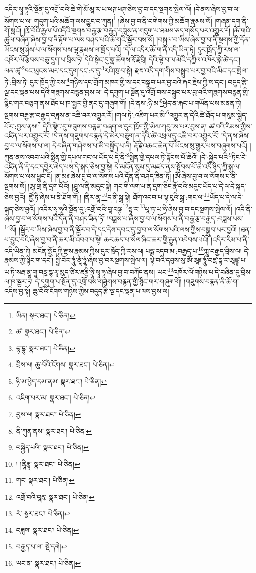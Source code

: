 འདིར་སྭཱ་ཧཱའི་སྔོན་དུ་འགྲོ་བའི་ཆེ་གེ་མོ་མཱ་ར་ཡ་ཕཊ་ཕཊ་ཅེས་བྱ་བ་དང་སྔགས་སྤེལ་ལོ། །དེ་ནས་ཞེས་བྱ་བ་ལ་སོགས་པ་ལ། གདུག་པའི་མཆོག་ལས་བྱུང་བ་ཀུན།\footnote{ཡིན།  སྣར་ཐང་།  པེ་ཅིན། } །ཞེས་བྱ་བ་ནི་བགེགས་ཀྱི་མཆོག་རྣམས་སོ། །གཞན་དག་ནི་གོ་སླའོ། །ཁྲོ་བོའི་རྒྱལ་པོ་འདིའི་སྔགས་བརྒྱ་རྩ་བརྒྱད་བཟླས་ན་གདུག་པ་ཐམས་ཅད་གསོད་པར་འགྱུར་རོ། །ཆོ་གའི་ཚུལ་བཞིན་ཞེས་བྱ་བ་ནི་རྟོག་པ་ལས་བཤད་པའི་ཆོ་གའི་སྦྱོར་བས་སོ། །བསྐུལ་བ་ཡིས་ཞེས་བྱ་བ་ནི་སྔགས་ཀྱི་དོན་ཡོངས་སུ་ཤེས་པ་ལ་སོགས་པས་ལྷ་རྣམས་ལ་སྦོད་པའོ། །དེ་ལ་འདིར་ཆོ་ག་ནི་འདི་ཡིན་ཏེ། དུར་ཁྲོད་ཀྱི་རས་ལ་འཁོར་ལོ་རྩིབས་བཅུ་དྲུག་པ་བྲིས་ཏེ། དེའི་སྟེང་དུ་སྣ་ཚོགས་རྡོ་རྗེ་བྲི། དེའི་ལྟེ་བ་ལ་མེའི་དཀྱིལ་འཁོར་སྐེ་ཚེ་དང་། ལན་ཚྭ་\footnote{ཚ་  སྣར་ཐང་།  པེ་ཅིན། }དང་ཡུངས་མར་དང་དུག་དང་:ད་དུ་\footnote{དྷ་དྷུ་  སྣར་ཐང་།  པེ་ཅིན། }རའི་ཁུ་བ་སྟེ། རྫས་འདི་དག་གིས་བསྒྲུབ་པར་བྱ་བའི་མིང་དང་སྤེལ་ཏེ་:བྲིས་ཏེ། དུར་ཁྲོད་ཀྱི་རས་\footnote{བྲིས་ལ། ཆུ་བོའི་ངོགས་  སྣར་ཐང་།  པེ་ཅིན། }གཉིས་དང་གྲོག་མཁར་གྱི་ས་དང་བསྒྲུབ་པར་བྱ་བའི་རྐང་རྗེས་ཀྱི་ས་དང་། བདུད་རྩི་ལྔ་དང་ལྡན་པས་དེའི་གཟུགས་བརྙན་བྱས་ལ། དེ་དགུག་པ་སྔོན་དུ་འགྲོ་བས་བསྒྲུབ་པར་བྱ་བའི་གཟུགས་བརྙན་གྱི་སྙིང་གར་བཅུག་ནས་ཐོད་པ་ཁ་སྦྱར་གྱི་ནང་དུ་གཞུག་གོ། །དེ་ནས་:ཉི་མ་\footnote{ཉི་མ་ཕྱེད་དམ་ནམ་  སྣར་ཐང་།  པེ་ཅིན། }ཕྱེད་ན་རྐང་པ་གཡོན་པས་མནན་ཏེ། སྔགས་བརྒྱ་རྩ་བརྒྱད་བཟླས་ན་འཆི་བར་འགྱུར་རོ། །གལ་ཏེ་:འཇིག་པར་མི་\footnote{འཇིག་པར་མ་  སྣར་ཐང་།  པེ་ཅིན། }འགྱུར་ན་དེའི་ཚེ་ཐོད་པ་གསུམ་སྒྱེད་པོར་:བྱས་ནས།\footnote{བྱས་ལ།  སྣར་ཐང་།  པེ་ཅིན། } དེའི་སྟེང་དུ་གཟུགས་བརྙན་བཞག་ལ་དུར་ཁྲོད་ཀྱི་མེས་གདུངས་པར་བྱས་ན། ཚ་བའི་རིམས་ཀྱིས་འཛིན་པར་འགྱུར་རོ། །དེ་ནས་གཟུགས་བརྙན་དེ་མེར་བཅུག་ན་དེའི་ཚེ་འཕྲལ་དུ་འཆི་བར་འགྱུར་རོ། །དེ་ནས་ཞེས་བྱ་བ་ལ་སོགས་པ་ལ། དེ་བཞིན་གཤེགས་པ་མི་བསྐྱོད་པ་ནི། རྡོ་རྗེ་འཆང་ཆེན་པོ་ཡོངས་སུ་གྱུར་པས་བཞུགས་པའོ། །ཀུན་ནས་འབབ་པའི་སྤྲིན་གྱི་དཔལ་གང་ལ་ཡོད་པ་དེ་ནི་\footnote{ནི་ཀུན་ནས་  སྣར་ཐང་།  པེ་ཅིན། }སྤྲིན་གྱི་དཔལ་ཏེ་སྟོབས་པོ་ཆེའོ། །དེ་:སྐྱེད་པའི་\footnote{བསྐྱེད་པའི་  སྣར་ཐང་།  པེ་ཅིན། }ཏིང་ངེ་འཛིན་ནི་དེ་དང་དབྱེར་མེད་པས་དེ་སྐད་ཅེས་བྱ་སྟེ། དེ་མངོན་སུམ་དུ་མཛད་ནས་སྟོབས་པོ་ཆེ་འདི་ཉིད་ཀྱི་སྐུ་ལ་སོགས་པ་ལས་ཕྱུང་ངོ། །ན་མཿ་ཞེས་བྱ་བ་ལ་སོགས་པའི་དོན་ནི་བཤད་ཟིན་ཏོ། །ཨོཾ་ཞེས་བྱ་བ་ལ་སོགས་པ་ནི་སྔགས་སོ། །ཨུ་གྲ་ནི་དྲག་པོའོ། །ཤཱུ་ལ་ནི་མདུང་སྟེ། གང་གི་ལག་པ་ན་དྲག་ཅིང་རྣོ་བའི་མདུང་ཡོད་པ་དེ་ལ་དེ་སྐད་ཅེས་བྱའོ། །ཛྱོ་ཏི་ཞེས་པ་ནི་ཐོག་གོ:། །ནིར་ནཱ་\footnote{། །ནཱིརྣཱ་  སྣར་ཐང་།  པེ་ཅིན། }ད་ནི་སྒྲ་སྟེ། ཐོག་འབབ་པ་ལྟ་བུའི་སྒྲ་:གང་ལ་\footnote{གང་  སྣར་ཐང་།  པེ་ཅིན། }ཡོད་པ་དེ་ལ་དེ་སྐད་ཅེས་བྱའོ། །འདིར་སྭཱ་ཧཱའི་སྔོན་དུ་:འགྲོ་བའི་བཱ་རཥྚ་\footnote{འགྲོ་བའི་བཱརྵ་  སྣར་ཐང་།  པེ་ཅིན། }དྷཱ་ར་\footnote{རཾ་  སྣར་ཐང་།  པེ་ཅིན། }པཱ་ཏ་ཡ་ཧྲི་ཞེས་བྱ་བ་དང་སྔགས་སྤེལ་ལོ། །འདི་ནི་ཞེས་བྱ་བ་ལ་སོགས་པའི་དོན་ནི་བཤད་ཟིན་ཏོ། །བཟླས་པ་ཞེས་བྱ་བ་ལ་སོགས་པ་ནི་བརྒྱ་རྩ་བརྒྱད་:བཟླས་པས་\footnote{བཟླས་  སྣར་ཐང་།  པེ་ཅིན། }སོ། །སྦྱོར་བ་ཡིས་ཞེས་བྱ་བ་ནི་སྦྱོར་བ་དེ་དང་དེས་དབང་དུ་བྱ་བ་ལ་སོགས་པའི་ལས་ཀྱིས་བསྒྲུབ་པར་བྱའོ། །ཐན་པ་བྱུང་བའི་ཞེས་བྱ་བ་ནི་ཆར་མི་འབབ་པ་སྟེ། ཆར་ཆད་པ་སེལ་ཞིང་ཆར་གྱི་རྒྱུན་འབེབས་པའོ། །འདིར་རིམ་པ་ནི་འདི་ཡིན་ཏེ། མངོན་སྤྱོད་ཀྱི་རྫས་རྣམས་ཀྱིས་དུར་ཁྲོད་ཀྱི་རས་ལ། པདྨ་འདབ་མ་:བརྒྱད་པ་\footnote{བརྒྱད་པ་ལ་  སྡེ་དགེ། }ཀླུ་བརྒྱད་བྲིས་ལ། དེ་རྣམས་ཀྱི་སྙིང་ག་དང་། སྤྱི་བོར་ཧཱུཾ་ནཱཾ་ཧཱུཾ་ཞེས་བྱ་བར་སྔགས་སྤེལ་ལ། ལྟེ་བའི་དབུས་སུ་ཨོཾ་ཨཱཿ་ཧཱུཾ་བཛྲ་དྷ་ར་ཨཱཛྙཱ་པ་ཡ་ཏི་སརྦ་ནཱ་གཱ་བཪྵ་དྷ་རཱ་མུད་ཙིར་ཛནྟི་ཧྲཱི་སྭཱ་ཧཱ་ཞེས་བྱ་བ་བཀོད་ནས། ཡང་\footnote{ཡང་ན་  སྣར་ཐང་།  པེ་ཅིན། }འཁོར་ལོ་གཉིས་པ་དེ་བཞིན་དུ་བྲིས་ལ་ཁ་སྦྱར་ཏེ། དེ་དགུག་པ་སྔོན་དུ་འགྲོ་བས་གཟུགས་བརྙན་གྱི་སྙིང་གར་གཞུག་གོ། །གཟུགས་བརྙན་ནི་ཆོ་ག་འདིས་བྱ་སྟེ། ཆུ་བོའི་ངོགས་གཉིས་ཀྱིས་བདུད་རྩི་ལྔ་དང་ལྡན་པ་ལས་བྱས་ལ། 